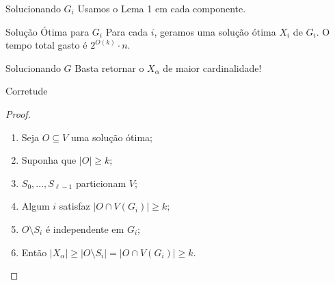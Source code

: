 \begin{frame}{Solucionando $G_i$}
    \centering\Large
    Usamos o Lema 1 em cada componente.
\end{frame}

\begin{frame}{Solução Ótima para $G_i$}
    \centering\Large
    Para cada $i$, geramos uma solução ótima $X_i$ de $G_i$.
    \bigbreak
    O tempo total gasto é $2^{O(k)} \cdot n$.
\end{frame}

\begin{frame}{Solucionando $G$}
    \centering\Large
    Basta retornar o $X_\alpha$ de maior cardinalidade!
\end{frame}

\begin{frame}{Corretude}
    \pause
    \begin{proof}
        \begin{enumerate}
            \setlength\itemsep{1em}
            \item<2,8> Seja $O \subseteq V$ uma solução ótima;
            \item<3,8> Suponha que $|O| \ge k$;
            \item<4,8> $S_0, \dots, S_{\ell-1}$ particionam $V$;
            \item<5,8> Algum $i$ satisfaz $|O \cap V(G_i)| \ge k$;
            \item<6,8> $O \setminus S_i$ é independente em $G_i$;
            \item<7,8> Então $|X_\alpha| \ge |O \setminus S_i| = |O \cap V(G_i)| \ge k$.
        \end{enumerate}
    \end{proof}
\end{frame}
